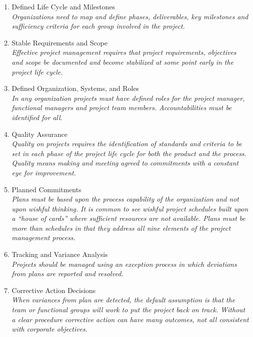 \begin{enumerate}
\item Defined Life Cycle and Milestones \\
\textit{Organizations need to map and define phases, deliverables, key milestones and sufficiency criteria for each group involved in the project.}\cite{salapatas2000}

\item Stable Requirements and Scope \\
\textit{Effective project management requires that project requirements, objectives and scope be documented and become stabilized at some point early in the project life cycle.}\cite{salapatas2000}

\item Defined Organization, Systems, and Roles \\
\textit{In any organization projects must have defined roles for the project manager, functional managers and project team members. Accountabilities must be identified for all.}\cite{salapatas2000}

\item Quality Assurance \\
\textit{Quality on projects requires the identification of standards and criteria to be set in each phase of the project life cycle for both the product and the process. Quality means making and meeting agreed to commitments with a constant eye for improvement.}\cite{salapatas2000}

\item Planned Commitments \\
\textit{Plans must be based upon the process capability of the organization and not upon wishful thinking. It is common to see wishful project schedules built upon a ``house of cards'' where sufficient resources are not available. Plans must be more than schedules in that they address all nine elements of the project management process.}\cite{salapatas2000}

\item Tracking and Variance Analysis \\
\textit{Projects should be managed using an exception process in which deviations from plans are reported and resolved.}\cite{salapatas2000}

\item Corrective Action Decisions \\
\textit{When variances from plan are detected, the default assumption is that the team or functional groups will work to put the project back on track. Without a clear procedure corrective action can have many outcomes, not all consistent with corporate objectives.}\cite{salapatas2000}


\end{enumerate}
